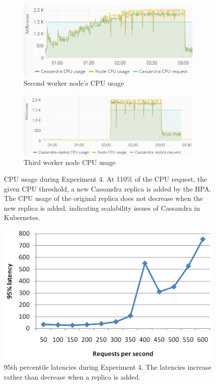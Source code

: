 \begin{figure}
\centering
\begin{subfigure}[b]{\columnwidth}
\centering
\includegraphics[width=0.70\columnwidth]{Images/Experiments/CPU/Grafana/cpu-cas-hpa-li-1.PNG}
\caption{Second worker node's CPU usage}
\label{fig:cpu-cas-hpa-li-1}
\end{subfigure}
\hfill
\begin{subfigure}[b]{\columnwidth}
\centering
\includegraphics[width=0.70\columnwidth]{Images/Experiments/CPU/Grafana/cpu-cas-hpa-li-2.PNG}
\caption{Third worker node CPU usage}
\label{fig:cpu-cas-hpa-li-2}
\end{subfigure}
\hfill
\vspace*{-7mm}
\caption{CPU usage during Experiment 4. At 110\% of the CPU request, the given CPU threshold, a new Cassandra replica is added by the HPA. The CPU usage of the original replica does not decrease when the new replica is added, indicating scalability issues of Cassandra in Kubernetes.}
\vspace{-4mm}
\label{fig:cpu-cas-hpa-li}
\end{figure}

\begin{figure}
\centering
\includegraphics[width=0.55\columnwidth]{Images/Experiments/CPU/Latencies/lat-cas-hpa-li.PNG}
\caption{95th percentile latencies during Experiment 4. The latencies increase rather than decrease when a replica is added.}
\vspace{-7mm}
\label{fig:lat-cas-hpa-li}
\end{figure}

